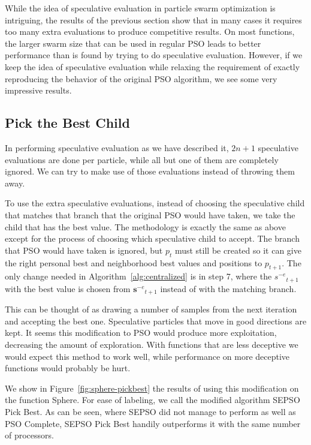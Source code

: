 \documentclass[journal,letterpaper]{IEEEtran}
\newcommand{\fig}[1]{Figure~\ref{fig:#1}}
\newcommand{\alg}[1]{Algorithm~\ref{alg:#1}}
\providecommand{\noeval}[1]{\ensuremath{#1^{-e}}}
\providecommand{\p}{\ensuremath{p}}
\providecommand{\s}{\ensuremath{s}}
\providecommand{\sset}{\ensuremath{\mathbf{s}}}
\begin{document}
While the idea of speculative evaluation in particle swarm optimization is
intriguing, the results of the previous section show that in many cases it
requires too many extra evaluations to produce competitive results.  On most
functions, the larger swarm size that can be used in regular PSO leads to
better performance than is found by trying to do speculative evaluation.
However, if we keep the idea of speculative evaluation while relaxing the
requirement of exactly reproducing the behavior of the original PSO algorithm,
we see some very impressive results.

\subsection{Pick the Best Child}

In performing speculative evaluation as we have described it, $2n+1$
speculative evaluations are done per particle, while all but one of them are
completely ignored.  We can try to make use of those evaluations instead of
throwing them away.  

To use the extra speculative evaluations, instead of choosing the speculative
child that matches that branch that the original PSO would have taken, we take
the child that has the best value.  The methodology is exactly the same as
above except for the process of choosing which speculative child to accept.
The branch that PSO would have taken is ignored, but $\p_t$ must still be
created so it can give the right personal best and neighborhood best values and
positions to $\p_{t+1}$.  The only change needed in \alg{centralized} is in
step 7, where the $\noeval{\s}_{t+1}$ with the best value is chosen from
$\noeval{\sset}_{t+1}$ instead of with the matching branch.

This can be thought of as drawing a number of samples from the next iteration
and accepting the best one.  Speculative particles that move in good directions
are kept.  It seems this modification to PSO would produce more exploitation,
decreasing the amount of exploration.  With functions that are less deceptive
we would expect this method to work well, while performance on more deceptive
functions would probably be hurt.

We show in \fig{sphere-pickbest} the results of using this modification on the
function Sphere.  For ease of labeling, we call the modified algorithm SEPSO
Pick Best.  As can be seen, where SEPSO did not manage to perform as well as
PSO Complete, SEPSO Pick Best handily outperforms it with the same number of
processors.
\end{document}

